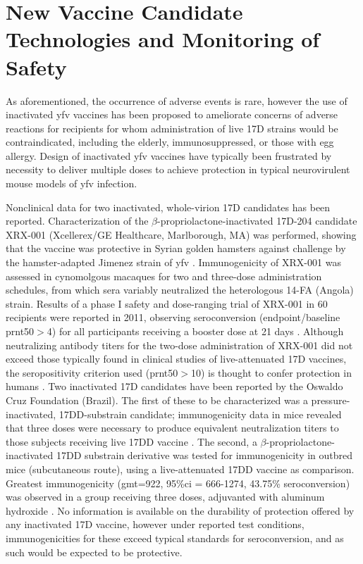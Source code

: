 \section{New Vaccine Candidate Technologies and Monitoring of Safety}
As aforementioned, the occurrence of adverse events is rare, however the use of inactivated \gls{yfv} vaccines has been proposed to ameliorate concerns of adverse reactions for recipients for whom administration of live 17D strains would be contraindicated, including the elderly, immunosuppressed, or those with egg allergy. Design of inactivated \gls{yfv} vaccines have typically been frustrated by necessity to deliver multiple doses to achieve protection in typical neurovirulent mouse models of \gls{yfv} infection.
	
Nonclinical data for two inactivated, whole-virion 17D candidates has been reported. Characterization of the $\beta$-propriolactone-inactivated 17D-204 candidate XRX-001 (Xcellerex/GE Healthcare, Marlborough, MA) was performed, showing that the vaccine was protective in Syrian golden hamsters against challenge by the hamster-adapted Jimenez strain of \gls{yfv} \parencite{Monath:2010bu}. Immunogenicity of XRX-001 was assessed in cynomolgous macaques for two and three-dose administration schedules, from which sera variably neutralized the heterologous 14-FA (Angola) strain. Results of a phase I safety and dose-ranging trial of XRX-001 in 60 recipients were reported in 2011, observing seroconversion (endpoint/baseline \gls{prnt50}$>$4) for all participants receiving a booster dose at 21 days \parencite{Monath:2011kx}. Although neutralizing antibody titers for the two-dose administration of XRX-001 did not exceed those typically found in clinical studies of live-attenuated 17D vaccines, the seropositivity criterion used (\gls{prnt50}$>$10) is thought to confer protection in humans \parencite{Camacho:2004ui}. Two inactivated 17D candidates have been reported by the Oswaldo Cruz Foundation (Brazil). The first of these to be characterized was a pressure-inactivated, 17DD-substrain candidate; immunogenicity data in mice revealed that three doses were necessary to produce equivalent neutralization titers to those subjects receiving live 17DD vaccine \parencite{Gaspar:2008hj}. The second, a $\beta$-propriolactone-inactivated 17DD substrain derivative was tested for immunogenicity in outbred mice (subcutaneous route), using a live-attenuated 17DD vaccine as comparison. Greatest immunogenicity (\gls{gmt}=922, 95\%\gls{ci} = 666-1274, 43.75\% seroconversion) was observed in a group receiving three doses, adjuvanted with aluminum hydroxide \parencite{Pereira:2015kk}. No information is available on the durability of protection offered by any inactivated 17D vaccine, however under reported test conditions, immunogenicities for these exceed typical standards for seroconversion, and as such would be expected to be protective.
	
